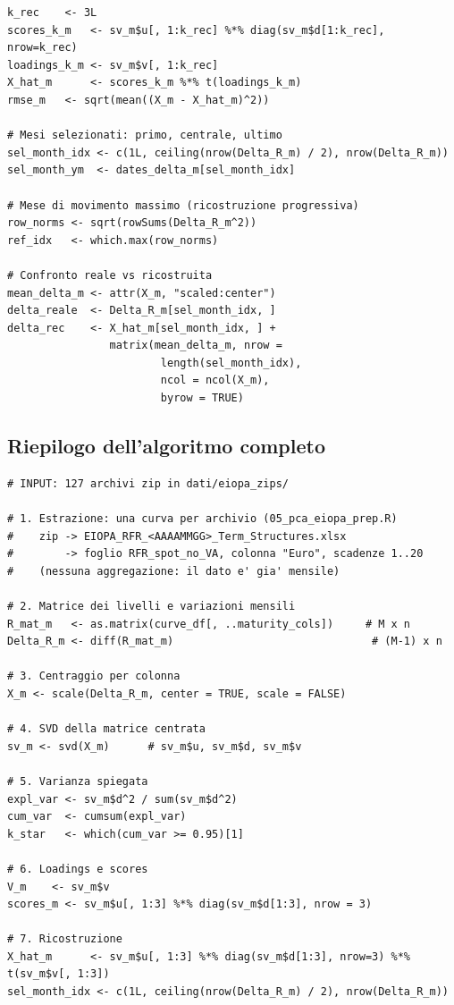 \documentclass[11pt,a4paper]{article}
\theoremstyle{plain}
\theoremstyle{definition}
\theoremstyle{remark}
\begin{document}
\begin{codebox}
\begin{Verbatim}[fontsize=\small]
k_rec    <- 3L
scores_k_m   <- sv_m$u[, 1:k_rec] %*% diag(sv_m$d[1:k_rec], nrow=k_rec)
loadings_k_m <- sv_m$v[, 1:k_rec]
X_hat_m      <- scores_k_m %*% t(loadings_k_m)
rmse_m   <- sqrt(mean((X_m - X_hat_m)^2))

# Mesi selezionati: primo, centrale, ultimo
sel_month_idx <- c(1L, ceiling(nrow(Delta_R_m) / 2), nrow(Delta_R_m))
sel_month_ym  <- dates_delta_m[sel_month_idx]

# Mese di movimento massimo (ricostruzione progressiva)
row_norms <- sqrt(rowSums(Delta_R_m^2))
ref_idx   <- which.max(row_norms)

# Confronto reale vs ricostruita
mean_delta_m <- attr(X_m, "scaled:center")
delta_reale  <- Delta_R_m[sel_month_idx, ]
delta_rec    <- X_hat_m[sel_month_idx, ] +
                matrix(mean_delta_m, nrow =
                        length(sel_month_idx),
                        ncol = ncol(X_m),
                        byrow = TRUE)
\end{Verbatim}
\end{codebox}

\subsection{Riepilogo dell'algoritmo completo}

\begin{algobox}
\begin{Verbatim}[fontsize=\small]
# INPUT: 127 archivi zip in dati/eiopa_zips/

# 1. Estrazione: una curva per archivio (05_pca_eiopa_prep.R)
#    zip -> EIOPA_RFR_<AAAAMMGG>_Term_Structures.xlsx
#        -> foglio RFR_spot_no_VA, colonna "Euro", scadenze 1..20
#    (nessuna aggregazione: il dato e' gia' mensile)

# 2. Matrice dei livelli e variazioni mensili
R_mat_m   <- as.matrix(curve_df[, ..maturity_cols])     # M x n
Delta_R_m <- diff(R_mat_m)                               # (M-1) x n

# 3. Centraggio per colonna
X_m <- scale(Delta_R_m, center = TRUE, scale = FALSE)

# 4. SVD della matrice centrata
sv_m <- svd(X_m)      # sv_m$u, sv_m$d, sv_m$v

# 5. Varianza spiegata
expl_var <- sv_m$d^2 / sum(sv_m$d^2)
cum_var  <- cumsum(expl_var)
k_star   <- which(cum_var >= 0.95)[1]

# 6. Loadings e scores
V_m    <- sv_m$v
scores_m <- sv_m$u[, 1:3] %*% diag(sv_m$d[1:3], nrow = 3)

# 7. Ricostruzione
X_hat_m      <- sv_m$u[, 1:3] %*% diag(sv_m$d[1:3], nrow=3) %*% t(sv_m$v[, 1:3])
sel_month_idx <- c(1L, ceiling(nrow(Delta_R_m) / 2), nrow(Delta_R_m))
\end{Verbatim}
\end{algobox}
\end{document}
